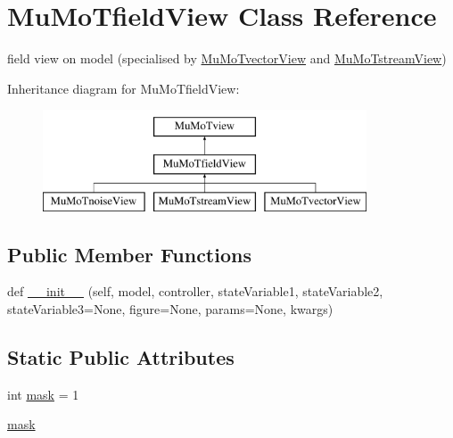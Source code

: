 \hypertarget{class_mu_mo_t_1_1_mu_mo_t_1_1_mu_mo_tfield_view}{}\section{Mu\+Mo\+Tfield\+View Class Reference}
\label{class_mu_mo_t_1_1_mu_mo_t_1_1_mu_mo_tfield_view}


field view on model (specialised by \hyperlink{class_mu_mo_t_1_1_mu_mo_t_1_1_mu_mo_tvector_view}{Mu\+Mo\+Tvector\+View} and \hyperlink{class_mu_mo_t_1_1_mu_mo_t_1_1_mu_mo_tstream_view}{Mu\+Mo\+Tstream\+View})  


Inheritance diagram for Mu\+Mo\+Tfield\+View\+:\begin{figure}[H]
\begin{center}
\leavevmode
\includegraphics[height=3.000000cm]{class_mu_mo_t_1_1_mu_mo_t_1_1_mu_mo_tfield_view}
\end{center}
\end{figure}
\subsection*{Public Member Functions}
\begin{DoxyCompactItemize}
\item 
def \hyperlink{class_mu_mo_t_1_1_mu_mo_t_1_1_mu_mo_tfield_view_a78d68546a28ea07c46f5f4a44ddfa49a}{\+\_\+\+\_\+init\+\_\+\+\_\+} (self, model, controller, state\+Variable1, state\+Variable2, state\+Variable3=None, figure=None, params=None, kwargs)
\end{DoxyCompactItemize}
\subsection*{Static Public Attributes}
\begin{DoxyCompactItemize}
\item 
int \hyperlink{class_mu_mo_t_1_1_mu_mo_t_1_1_mu_mo_tfield_view_ab77cc972f3ee899689ba053015472ccd}{mask} = 1
\item 
\hyperlink{class_mu_mo_t_1_1_mu_mo_t_1_1_mu_mo_tfield_view_a5d76cc2129e79ba1941d2cc2f53b9e8e}{mask}
\end{DoxyCompactItemize}
